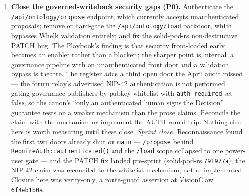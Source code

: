 \begin{enumerate}
  \item \textbf{Close the governed-writeback security gaps (P0).} Authenticate the \texttt{/api/ontology/propose} endpoint, which currently accepts unauthenticated proposals; remove or hard-gate the \texttt{/api/ontology/load} backdoor, which bypasses Whelk validation entirely; and fix the solid-pod-rs non-destructive PATCH bug. The Playbook's finding is that security front-loaded early becomes an enabler rather than a blocker \parencite{Pereira2026Playbook}; the sharper point is internal: a governance pipeline with an unauthenticated front door and a validation bypass is theatre. The register adds a third open door the April audit missed --- the forum relay's advertised NIP-42 authentication is not performed, gating governance publishers by pubkey whitelist with \texttt{auth\_required} set false, so the canon's ``only an authenticated human signs the Decision'' guarantee rests on a weaker mechanism than the prose claims. Reconcile the claim with the mechanism or implement the AUTH round-trip. Nothing else here is worth measuring until these close. \emph{Sprint close.} Reconnaissance found the first two doors already shut on \texttt{main} --- \texttt{/propose} behind \texttt{RequireAuth::authenticated()} and the \texttt{/load} scope collapsed to one power-user gate --- and the PATCH fix landed pre-sprint (solid-pod-rs \texttt{791977a}); the NIP-42 claim was reconciled to the whitelist mechanism, not re-implemented. Closure here was verify-only, a route-guard assertion at VisionClaw \texttt{6f4eb1b0a}.


\end{enumerate}
